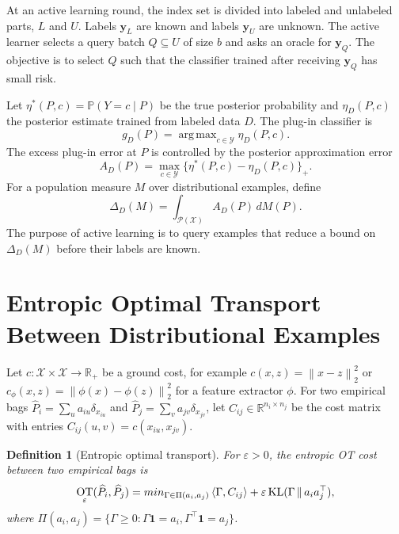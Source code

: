\documentclass[11pt,a4paper]{article}
\newtheorem{definition}{Definition}
\DeclareMathOperator*{\argmax}{arg\,max}
\DeclareMathOperator{\KL}{KL}
\DeclareMathOperator{\OT}{OT}
\newcommand{\Pbb}{\mathbb{P}}
\newcommand{\R}{\mathbb{R}}
\newcommand{\cY}{\mathcal{Y}}
\newcommand{\cX}{\mathcal{X}}
\newcommand{\cP}{\mathcal{P}}
\newcommand{\norm}[1]{\left\lVert #1\right\rVert}
\newcommand{\ip}[2]{\left\langle #1,#2\right\rangle}
\begin{document}
At an active learning round, the index set is divided into labeled and unlabeled parts, $L$ and $U$. Labels $\bm y_L$ are known and labels $\bm y_U$ are unknown. The active learner selects a query batch $Q\subseteq U$ of size $b$ and asks an oracle for $\bm y_Q$. The objective is to select $Q$ such that the classifier trained after receiving $\bm y_Q$ has small risk.

Let $\eta^*(P,c)=\Pbb(Y=c\mid P)$ be the true posterior probability and $\eta_D(P,c)$ the posterior estimate trained from labeled data $D$. The plug-in classifier is
\begin{equation}
g_D(P)=\argmax_{c\in\cY}\eta_D(P,c).
\end{equation}
The excess plug-in error at $P$ is controlled by the posterior approximation error
\begin{equation}
A_D(P)=\max_{c\in\cY}\{\eta^*(P,c)-\eta_D(P,c)\}_+.
\label{eq:posterior-error}
\end{equation}
For a population measure $M$ over distributional examples, define
\begin{equation}
\Delta_D(M)=\int_{\cP(\cX)}A_D(P)\,dM(P).
\label{eq:delta-D}
\end{equation}
The purpose of active learning is to query examples that reduce a bound on $\Delta_D(M)$ before their labels are known.

\section{Entropic Optimal Transport Between Distributional Examples}

Let $c:\cX\times\cX\to\R_+$ be a ground cost, for example $c(x,z)=\norm{x-z}_2^2$ or $c_\phi(x,z)=\norm{\phi(x)-\phi(z)}_2^2$ for a feature extractor $\phi$. For two empirical bags $\widehat P_i=\sum_u a_{iu}\delta_{x_{iu}}$ and $\widehat P_j=\sum_v a_{jv}\delta_{x_{jv}}$, let $C_{ij}\in\R^{n_i\times n_j}$ be the cost matrix with entries $C_{ij}(u,v)=c(x_{iu},x_{jv})$.

\begin{definition}[Entropic optimal transport]
For $\varepsilon>0$, the entropic OT cost between two empirical bags is
\begin{equation}
\OT_\varepsilon(\widehat P_i,\widehat P_j)
=\\min_{\Gamma\in\Pi(a_i,a_j)}
\ip{\Gamma}{C_{ij}}+\varepsilon\KL(\Gamma\,\|\,a_ia_j^\top),
\label{eq:entropic-ot}
\end{equation}
where $\Pi(a_i,a_j)=\{\Gamma\ge 0: \Gamma\mathbf{1}=a_i,\Gamma^\top\mathbf{1}=a_j\}$.
\end{definition}
\end{document}
